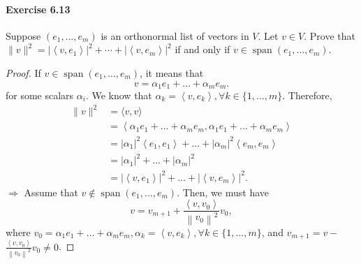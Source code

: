 \documentclass{article}
\theoremstyle{definition}
\begin{document}
\paragraph{Exercise 6.13} Suppose $\left(e_{1}, \ldots, e_{m}\right)$ is an orthonormal list of vectors in $V$. Let $v \in V$. Prove that $\|v\|^{2}=\left|\left\langle v, e_{1}\right\rangle\right|^{2}+\cdots+\left|\left\langle v, e_{m}\right\rangle\right|^{2}$ if and only if $v \in \operatorname{span}\left(e_{1}, \ldots, e_{m}\right)$.
\begin{proof}
If $v \in \operatorname{span}\left(e_1, \ldots, e_m\right)$, it means that
$$
v=\alpha_1 e_1+\ldots+\alpha_m e_m .
$$
for some scalars $\alpha_i$. We know that $\alpha_k=\left\langle v, e_k\right\rangle, \forall k \in\{1, \ldots, m\}$. Therefore,
$$
\begin{aligned}
\|v\|^2 & =\langle v, v\rangle \\
& =\left\langle\alpha_1 e_1+\ldots+\alpha_m e_m, \alpha_1 e_1+\ldots+\alpha_m e_m\right\rangle \\
& =\left|\alpha_1\right|^2\left\langle e_1, e_1\right\rangle+\ldots+\left|\alpha_m\right|^2\left\langle e_m, e_m\right\rangle \\
& =\left|\alpha_1\right|^2+\ldots+\left|\alpha_m\right|^2 \\
& =\left|\left\langle v, e_1\right\rangle\right|^2+\ldots+\left|\left\langle v, e_m\right\rangle\right|^2 .
\end{aligned}
$$
$\Rightarrow$ Assume that $v \notin \operatorname{span}\left(e_1, \ldots, e_m\right)$. Then, we must have
$$
v=v_{m+1}+\frac{\left\langle v, v_0\right\rangle}{\left\|v_0\right\|^2} v_0,
$$
where $v_0=\alpha_1 e_1+\ldots+\alpha_m e_m, \alpha_k=\left\langle v, e_k\right\rangle, \forall k \in\{1, \ldots, m\}$, and $v_{m+1}=v-$ $\frac{\left\langle v, v_0\right\rangle}{\left\|v_0\right\|^2} v_0 \neq 0$.


\end{proof}
\end{document}
